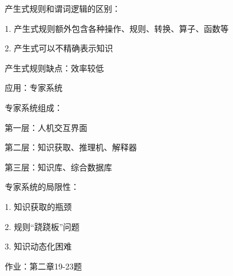 \begin{notation}
    产生式规则和谓词逻辑的区别：

    1. 产生式规则额外包含各种操作、规则、转换、算子、函数等

    2. 产生式可以不精确表示知识
\end{notation}
产生式规则缺点：效率较低

应用：专家系统
\begin{notation}
    专家系统组成：

    第一层：人机交互界面

    第二层：知识获取、推理机、解释器

    第三层：知识库、综合数据库
\end{notation}
专家系统的局限性：

1. 知识获取的瓶颈

2. 规则“跷跷板”问题

3. 知识动态化困难

作业：第二章19-23题
